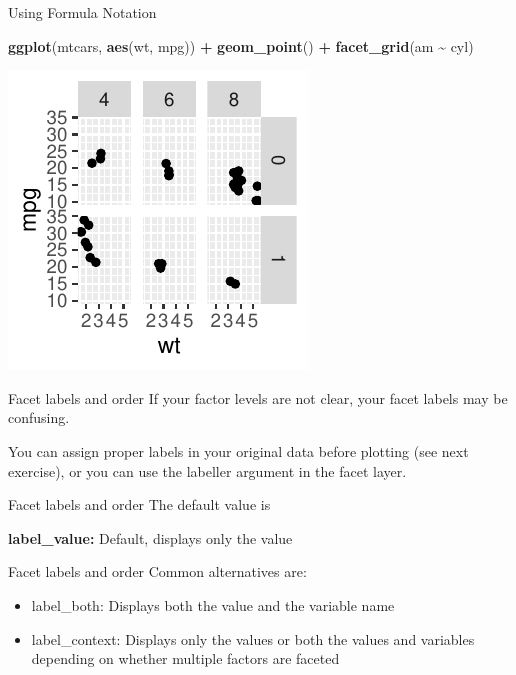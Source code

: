 \documentclass[
  ignorenonframetext,
]{beamer}
\newenvironment{Shaded}{\begin{snugshade}}{\end{snugshade}}
\newcommand{\FunctionTok}[1]{\textcolor[rgb]{0.13,0.29,0.53}{\textbf{#1}}}
\newcommand{\NormalTok}[1]{#1}
\newcommand{\SpecialCharTok}[1]{\textcolor[rgb]{0.81,0.36,0.00}{\textbf{#1}}}
\begin{document}
\begin{frame}[fragile]{Using Formula Notation}
\label{using-formula-notation-2}

\begin{Shaded}
\begin{Highlighting}[]
\FunctionTok{ggplot}\NormalTok{(mtcars, }\FunctionTok{aes}\NormalTok{(wt, mpg)) }\SpecialCharTok{+} \FunctionTok{geom\_point}\NormalTok{() }\SpecialCharTok{+} \FunctionTok{facet\_grid}\NormalTok{(am }\SpecialCharTok{\textasciitilde{}}
\NormalTok{    cyl)}
\end{Highlighting}
\end{Shaded}

\begin{center}\includegraphics[width=0.5\linewidth]{Figs/unnamed-chunk-81-1} \end{center}
\end{frame}

\begin{frame}{Facet labels and order}
\label{facet-labels-and-order}
If your factor levels are not clear, your facet labels may be confusing.

You can assign proper labels in your original data before plotting (see
next exercise), or you can use the labeller argument in the facet layer.
\end{frame}

\begin{frame}{Facet labels and order}
\label{facet-labels-and-order-1}
The default value is

\textbf{label\_value:} Default, displays only the value
\end{frame}

\begin{frame}{Facet labels and order}
\label{facet-labels-and-order-2}
Common alternatives are:

\begin{itemize}
\item
  label\_both: Displays both the value and the variable name
\item
  label\_context: Displays only the values or both the values and
  variables depending on whether multiple factors are faceted
\end{itemize}
\end{frame}
\end{document}
